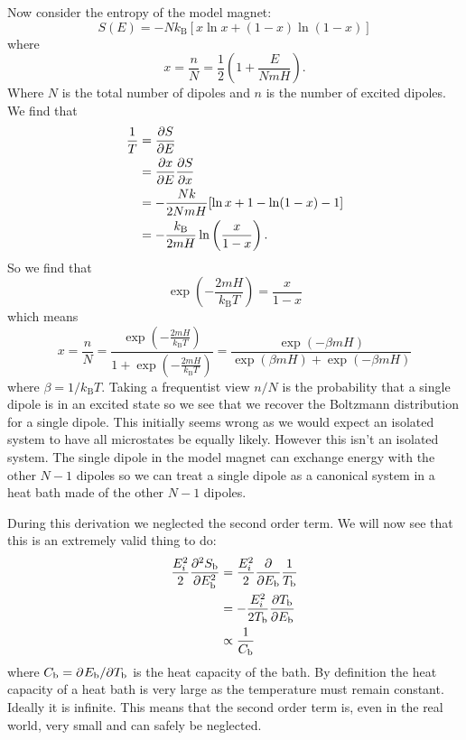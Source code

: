 \documentclass[a4paper]{article}
\newcommand{\boltzmann}{k_\mathrm{B}}
\begin{document}
\begin{example}
        Now consider the entropy of the model magnet:
        \[S(E) = -N\boltzmann[x\ln x + (1 - x)\ln(1 - x)]\]
        where
        \[x = \frac{n}{N} = \frac{1}{2}\left(1 + \frac{E}{NmH}\right).\]
        Where \(N\) is the total number of dipoles and \(n\) is the number of excited dipoles.
        We find that
        \begin{align*}
            \frac{1}{T} &= \pdv{S}{E}\\
            &= \pdv{x}{E}\pdv{S}{x}\\
            &= -\frac{Nk}{2NmH}[\ln x + 1 - \ln(1 - x) - 1]\\
            &= -\frac{\boltzmann}{2mH}\ln\left(\frac{x}{1 - x}\right).
        \end{align*}
        So we find that
        \[\exp\left(-\frac{2mH}{\boltzmann T}\right) = \frac{x}{1 - x}\]
        which means
        \[x = \frac{n}{N} = \frac{\exp\left(-\frac{2mH}{\boltzmann T}\right)}{1 + \exp\left(-\frac{2mH}{\boltzmann T}\right)} = \frac{\exp(-\beta mH)}{\exp(\beta mH) + \exp(-\beta mH)}\]
        where \(\beta = 1/\boltzmann T\).
        Taking a frequentist view \(n/N\) is the probability that a single dipole is in an excited state so we see that we recover the Boltzmann distribution for a single dipole.
        This initially seems wrong as we would expect an isolated system to have all microstates be equally likely.
        However this isn't an isolated system.
        The single dipole in the model magnet can exchange energy with the other \(N - 1\) dipoles so we can treat a single dipole as a canonical system in a heat bath made of the other \(N - 1\) dipoles.
    \end{example}
    
    During this derivation we neglected the second order term.
    We will now see that this is an extremely valid thing to do:
    \begin{align*}
        \frac{E_i^2}{2}\pdv[2]{S_{\mathrm{b}}}{E_{\mathrm{b}}} &= \frac{E_i^2}{2}\pdv{E_{\mathrm{b}}} \frac{1}{T_{\mathrm{b}}}\\
        &= -\frac{E_i^2}{2T_{\mathrm{b}}}\pdv{T_\mathrm{b}}{E_{\mathrm{b}}}\\
        &\propto \frac{1}{C_{\mathrm{b}}}
    \end{align*}
    where \(C_{\mathrm{b}} = \partial^{}{E_{\mathrm{b}}}/\partial{T_{\mathrm{b}}}^{}\) is the heat capacity of the bath.
    By definition the heat capacity of a heat bath is very large as the temperature must remain constant.
    Ideally it is infinite.
    This means that the second order term is, even in the real world, very small and can safely be neglected.
    
\end{document}
